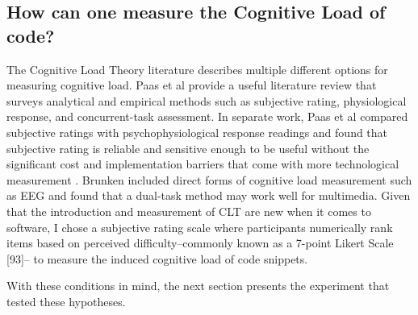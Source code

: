 \subsection{How can one measure the Cognitive Load of code?}

The Cognitive Load Theory literature describes multiple different options for measuring cognitive load. Paas et al provide a useful literature review \cite{Paas2003} that surveys analytical and empirical methods such as subjective rating, physiological response, and concurrent-task assessment. In separate work, Paas et al compared subjective ratings with psychophysiological response readings and found that subjective rating is reliable and sensitive enough to be useful without the significant cost and implementation barriers that come with more technological measurement \cite{Paas1994}. Brunken included direct forms of cognitive load measurement such as EEG \cite{Brunken2003} and found that a dual-task method may work well for multimedia. Given that the introduction and measurement of CLT are new when it comes to software, I chose a subjective rating scale where participants numerically rank items based on perceived difficulty--commonly known as a 7-point Likert Scale [93]-- to measure the induced cognitive load of code snippets.
       
With these conditions in mind, the next section presents the experiment that tested these hypotheses.
